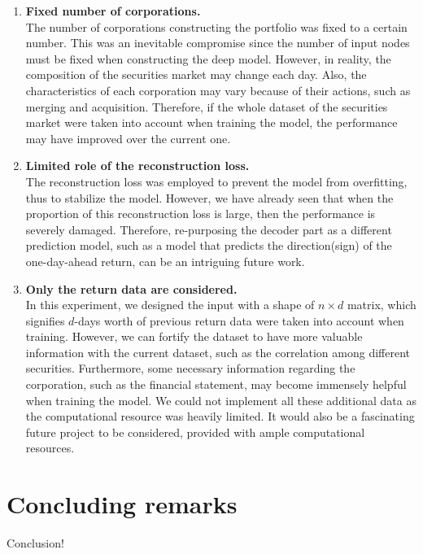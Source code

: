 \documentclass[11pt]{article}
\begin{document}
\begin{enumerate}
    \item \textbf{Fixed number of corporations.} \\
    The number of corporations constructing the portfolio was fixed to a certain number. This was an inevitable compromise since the number of input nodes must be fixed when constructing the deep model. However, in reality, the composition of the securities market may change each day. Also, the characteristics of each corporation may vary because of their actions, such as merging and acquisition. Therefore, if the whole dataset of the securities market were taken into account when training the model, the performance may have improved over the current one.
    \item \textbf{Limited role of the reconstruction loss.} \\
    The reconstruction loss was employed to prevent the model from overfitting, thus to stabilize the model. However, we have already seen that when the proportion of this reconstruction loss is large, then the performance is severely damaged. Therefore, re-purposing the decoder part as a different prediction model, such as a model that predicts the direction(sign) of the one-day-ahead return, can be an intriguing future work.
    \item \textbf{Only the return data are considered.} \\
    In this experiment, we designed the input with a shape of $n \times d$ matrix, which signifies $d$-days worth of previous return data were taken into account when training. However, we can fortify the dataset to have more valuable information with the current dataset, such as the correlation among different securities. Furthermore, some necessary information regarding the corporation, such as the financial statement, may become immensely helpful when training the model. We could not implement all these additional data as the computational resource was heavily limited. It would also be a fascinating future project to be considered, provided with ample computational resources.
\end{enumerate}





\section{Concluding remarks}
Conclusion!
\end{document}
